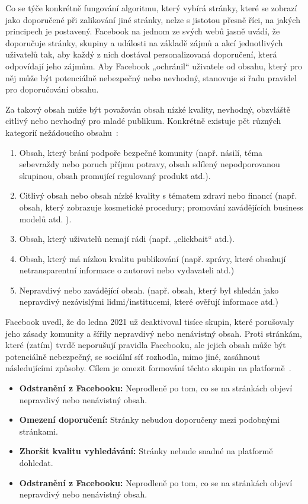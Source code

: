     Co se týče konkrétně fungování algoritmu, který vybírá stránky, které se zobrazí jako doporučené při zalikování jiné stránky, nelze s jistotou přesně říci, na jakých principech je postavený. Facebook na jednom ze svých webů jasně uvádí, že doporučuje stránky, skupiny a události na základě zájmů a akcí jednotlivých uživatelů tak, aby každý z nich dostával personalizovaná doporučení, která odpovídají jeho zájmům. Aby Facebook „ochránil“ uživatele od obsahu, který pro něj může být potenciálně nebezpečný nebo nevhodný, stanovuje si řadu pravidel pro doporučování obsahu.~\citep{rosen_2020}
    
    Za takový obsah může být považován obsah nízké kvality, nevhodný, obzvláště citlivý nebo nevhodný pro mladé publikum. Konkrétně existuje pět různých kategorií nežádoucího obsahu~\citep{facebook_2021B}:
    \begin{enumerate}
      \item Obsah, který brání podpoře bezpečné komunity (např. násilí, téma sebevraždy nebo poruch příjmu potravy, obsah sdílený nepodporovanou skupinou, obsah promující regulovaný produkt atd.).
      \item Citlivý obsah nebo obsah nízké kvality s tématem zdraví nebo financí (např. obsah, který zobrazuje kosmetické procedury; promování zavádějících business modelů atd. ). 
      \item Obsah, který uživatelů nemají rádi (např. „clickbait“ atd.).
      \item Obsah, který má nízkou kvalitu publikování (např. zprávy, které obsahují netransparentní informace o autorovi nebo vydavateli atd.)
      \item Nepravdivý nebo zavádějící obsah. (např. obsah, který byl shledán jako nepravdivý nezávislými lidmi/institucemi, které ověřují informace atd.) 
    \end{enumerate}
    
    \setlength\parskip{5mm}
    
    Facebook uvedl, že do ledna 2021 už deaktivoval tisíce skupin, které porušovaly jeho zásady komunity a šířily nepravdivý nebo nenávistný obsah. Proti stránkám, které (zatím) tvrdě neporušují pravidla Facebooku, ale jejich obsah může být potenciálně nebezpečný, se sociální síť rozhodla, mimo jiné, zasáhnout následujícími způsoby. Cílem je omezit formování těchto skupin na platformě~\citep{facebook_2021A}.
    \setlength\parskip{0mm}
    \begin{itemize}
        \item \textbf{Odstranění z Facebooku:} Neprodleně po tom, co se na stránkách objeví nepravdivý nebo nenávistný obsah.
        \item \textbf{Omezení doporučení:} Stránky nebudou doporučeny mezi podobnými stránkami. 
        \item \textbf{Zhoršit kvalitu vyhledávání:} Stránky nebude snadné na platformě dohledat.
        \item \textbf{Odstranění z Facebooku:} Neprodleně po tom, co se na stránkách objeví nepravdivý nebo nenávistný obsah.
    \end{itemize}

